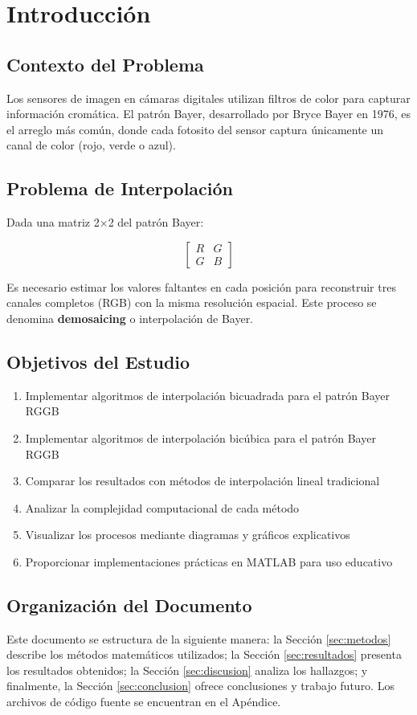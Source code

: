 \section{Introducción}

\subsection{Contexto del Problema}
Los sensores de imagen en cámaras digitales utilizan filtros de color para capturar información cromática. 
El patrón Bayer, desarrollado por Bryce Bayer en 1976, es el arreglo más común, donde cada fotosito del sensor 
captura únicamente un canal de color (rojo, verde o azul).

\subsection{Problema de Interpolación}
Dada una matriz 2×2 del patrón Bayer:

\[
\begin{bmatrix}
R & G \\
G & B
\end{bmatrix}
\]

Es necesario estimar los valores faltantes en cada posición para reconstruir tres canales completos (RGB) 
con la misma resolución espacial. Este proceso se denomina \textbf{demosaicing} o interpolación de Bayer.

\subsection{Objetivos del Estudio}
\begin{enumerate}
    \item Implementar algoritmos de interpolación bicuadrada para el patrón Bayer RGGB
    \item Implementar algoritmos de interpolación bicúbica para el patrón Bayer RGGB
    \item Comparar los resultados con métodos de interpolación lineal tradicional
    \item Analizar la complejidad computacional de cada método
    \item Visualizar los procesos mediante diagramas y gráficos explicativos
    \item Proporcionar implementaciones prácticas en MATLAB para uso educativo
\end{enumerate}

\subsection{Organización del Documento}
Este documento se estructura de la siguiente manera: la Sección \ref{sec:metodos} describe los métodos 
matemáticos utilizados; la Sección \ref{sec:resultados} presenta los resultados obtenidos; la Sección 
\ref{sec:discusion} analiza los hallazgos; y finalmente, la Sección \ref{sec:conclusion} ofrece conclusiones 
y trabajo futuro. Los archivos de código fuente se encuentran en el Apéndice.